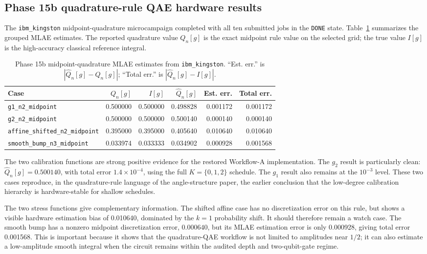 \subsection{Phase 15b quadrature-rule QAE hardware results}
\label{subsec:phase15b-quadrature-results}

The \texttt{ibm\_kingston} midpoint-quadrature microcampaign completed with all
ten submitted jobs in the \texttt{DONE} state. Table~\ref{tab:phase15b-results}
summarizes the grouped MLAE estimates. The reported quadrature value
\(Q_n[g]\) is the exact midpoint rule value on the selected grid; the true value
\(I[g]\) is the high-accuracy classical reference integral.

\begin{table}[h]
\centering
\begin{tabular}{lrrrrr}
\toprule
Case & \(Q_n[g]\) & \(I[g]\) & \(\widehat Q_n[g]\) & Est. err. & Total err. \\
\midrule
\texttt{g1\_n2\_midpoint} & 0.500000 & 0.500000 & 0.498828 & 0.001172 & 0.001172 \\
\texttt{g2\_n2\_midpoint} & 0.500000 & 0.500000 & 0.500140 & 0.000140 & 0.000140 \\
\texttt{affine\_shifted\_n2\_midpoint} & 0.395000 & 0.395000 & 0.405640 & 0.010640 & 0.010640 \\
\texttt{smooth\_bump\_n3\_midpoint} & 0.033974 & 0.033333 & 0.034902 & 0.000928 & 0.001568 \\
\bottomrule
\end{tabular}
\caption{Phase 15b midpoint-quadrature MLAE estimates from
\texttt{ibm\_kingston}. ``Est. err.'' is
\(|\widehat Q_n[g]-Q_n[g]|\); ``Total err.'' is
\(|\widehat Q_n[g]-I[g]|\).}
\label{tab:phase15b-results}
\end{table}

The two calibration functions are strong positive evidence for the restored
Workflow-A implementation. The \(g_2\) result is particularly clean:
\(\widehat Q_n[g]=0.500140\), with total error \(1.4\times10^{-4}\), using the
full \(K=\{0,1,2\}\) schedule. The \(g_1\) result also remains at the
\(10^{-3}\) level. These two cases reproduce, in the quadrature-rule language
of the angle-structure paper, the earlier conclusion that the low-degree
calibration hierarchy is hardware-stable for shallow schedules.

The two stress functions give complementary information. The shifted affine
case has no discretization error on this rule, but shows a visible hardware
estimation bias of 0.010640, dominated by the \(k=1\) probability shift. It
should therefore remain a watch case. The smooth bump has a nonzero midpoint
discretization error, \(0.000640\), but its MLAE estimation error is only
0.000928, giving total error 0.001568. This is important because it shows that
the quadrature-QAE workflow is not limited to amplitudes near \(1/2\); it can
also estimate a low-amplitude smooth integral when the circuit remains within
the audited depth and two-qubit-gate regime.


